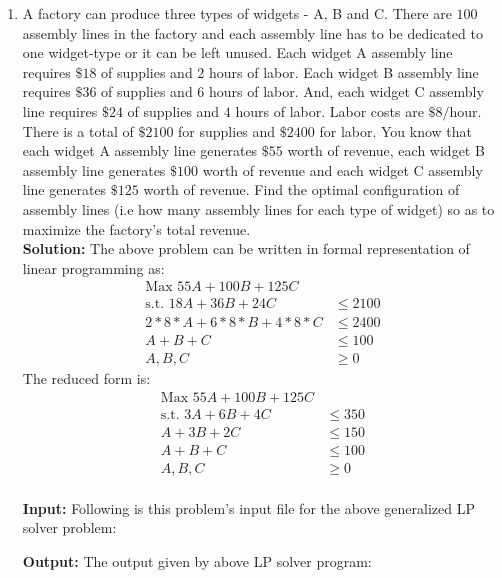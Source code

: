 \documentclass[12pt]{article}
\begin{document}
\begin{enumerate}

\begin{enumerate}
\item A factory can produce three types of widgets - A, B and C. There are $100$ assembly lines in the factory and each assembly line has to be dedicated to one widget-type or it can be left unused. Each widget A assembly line requires $\$18$ of supplies and $2$ hours of labor. Each widget B assembly line requires $\$36$ of supplies and $6$ hours of labor. And, each widget C assembly line requires $\$24$ of supplies and $4$ hours of labor. Labor costs are 
$\$8/$hour. There is a total of $\$2100$ for supplies and $\$2400$ for labor. You know that each widget A assembly line generates $\$55$ worth of revenue, each widget B assembly line generates $\$100$ worth of revenue and each widget C assembly line generates $\$125$ worth of revenue. Find the optimal configuration of assembly lines (i.e how many assembly lines for each type of widget) so as to maximize the factory’s total revenue.\\
\textbf{Solution:} The above problem can be written in formal representation of linear programming as:
\begin{align*}
\text{Max } 55A+100B+125C\\
\text{s.t. } 18A + 36B + 24C &\leq 2100\\
2*8*A + 6*8*B + 4*8*C &\leq 2400\\
A+B+C &\leq 100\\
A,B,C &\geq 0
\end{align*}
The reduced form is:
\begin{align*}
\text{Max } 55A+100B+125C\\
\text{s.t. } 3A + 6B + 4C &\leq 350\\
A + 3B + 2C &\leq 150\\
A+B+C &\leq 100\\
A,B,C &\geq 0
\end{align*}
\\
\textbf{Input:} Following is this problem's input file for the above generalized LP solver problem: 

\textbf{Output:} The output given by above LP solver program:



\end{enumerate}
\end{enumerate}
\end{document}
